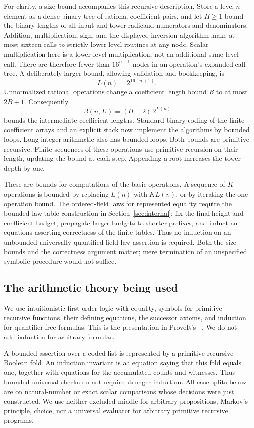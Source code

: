 For clarity, a size bound accompanies this recursive description.
Store a level-$n$ element as a dense binary tree of rational coefficient
pairs, and let $H\geq1$ bound the binary lengths of all input and tower
radicand numerators and denominators. Addition, multiplication, sign,
and the displayed inversion algorithm make at most sixteen calls to
strictly lower-level routines at any node. Scalar multiplication here
is a lower-level multiplication, not an additional same-level call.
There are therefore fewer than $16^{n+1}$ nodes in an operation's
expanded call tree. A deliberately larger bound, allowing validation
and bookkeeping, is
\[
 L(n)=2^{16(n+1)}.
\]
Unnormalized rational operations change a coefficient length bound $B$
to at most $2B+1$. Consequently
\begin{equation}\label{eq:bitbound}
 B(n,H)=(H+2)\,2^{L(n)}
\end{equation}
bounds the intermediate coefficient lengths. Standard binary coding of
the finite coefficient arrays and an explicit stack now implement the
algorithms by bounded loops. Long integer arithmetic also has bounded
loops. Both bounds are primitive recursive. Finite sequences of these
operations use primitive recursion on their length, updating the bound
at each step. Appending a root increases the tower depth by one.

These are bounds for computations of the basic operations. A sequence
of $K$ operations is bounded by replacing $L(n)$ with $K L(n)$, or by
iterating the one-operation bound. The ordered-field laws for
represented equality require the bounded law-table construction in
Section~\ref{sec:internal}: fix the final height and coefficient budget,
propagate larger budgets to shorter prefixes, and induct on equations
asserting correctness of the finite tables. Thus no induction on an
unbounded universally quantified field-law assertion is required.
Both the size bounds and the correctness argument matter; mere
termination of an unspecified symbolic procedure would not suffice.

\subsection{The arithmetic theory being used}

We use intuitionistic first-order logic with equality, symbols for
primitive recursive functions, their defining equations, the successor
axioms, and induction for quantifier-free formulas. This is the
presentation in ProveIt's ~\cite{proveit}.
We do not add induction for arbitrary formulas.

A bounded assertion over a coded list is represented by a primitive
recursive Boolean fold. An induction invariant is an equation saying
that this fold equals one, together with equations for the accumulated
counts and witnesses. Thus bounded universal checks do not require
stronger induction. All case splits below are on natural-number or exact
scalar comparisons whose decisions were just constructed. We use neither
excluded middle for arbitrary propositions, Markov's principle, choice,
nor a universal evaluator for arbitrary primitive recursive programs.
